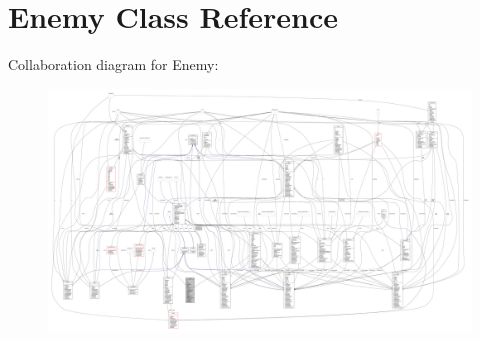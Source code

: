 \hypertarget{classenemies_1_1_enemy}{}\section{Enemy Class Reference}
\label{classenemies_1_1_enemy}


Collaboration diagram for Enemy\+:
\nopagebreak
\begin{figure}[H]
\begin{center}
\leavevmode
\includegraphics[width=350pt]{classenemies_1_1_enemy__coll__graph}
\end{center}
\end{figure}
